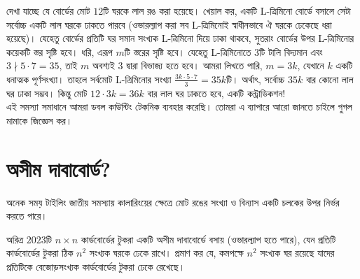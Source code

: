 \documentclass[11pt]{report}
\begin{document}
\begin{center}
\end{center}

দেখা যাচ্ছে যে বোর্ডের মোট $12$টি ঘরকে লাল রঙ করা হয়েছে। খেয়াল কর, একটি L-ত্রিমিনো বোর্ডে বসালে সেটা সর্বোচ্চ একটি লাল ঘরকে ঢাকতে পারবে (ওভারল্যাপ করা সব L-ত্রিমিনোই স্বাধীনভাবে ঐ ঘরকে ঢেকেছে ধরা হয়েছে)। যেহেতু বোর্ডের প্রতিটি ঘর সমান সংখ্যক L-ত্রিমিনো দিয়ে ঢাকা থাকবে, সুতরাং বোর্ডের উপর L-ত্রিমিনোর কয়েকটি স্তর সৃষ্টি হবে। ধরি, এরূপ $m$টি স্তরের সৃষ্টি হবে। যেহেতু L-ত্রিমিনোতে $3$টি টালি বিদ্যমান এবং $3 \nmid 5 \cdot 7 = 35$, তাই $m$ অবশ্যই $3$ দ্বারা বিভাজ্য হতে হবে। আমরা লিখতে পারি, $m = 3k$, যেখানে $k$ একটি ধনাত্মক পূর্ণসংখ্যা। তাহলে সর্বমোট L-ত্রিমিনোর সংখ্যা $\frac{3k \cdot 5 \cdot 7}{3} = 35k$টি। অর্থাৎ, সর্বোচ্চ $35k$ বার কোনো লাল ঘর ঢাকা সম্ভব। কিন্তু মোট $12 \cdot 3k = 36k$ বার লাল ঘর ঢাকতে হবে, একটি কন্ট্রাডিকশন!\\

এই সমস্যা সমাধানে আমরা ডবল কাউন্টিং টেকনিক ব্যবহার করেছি। তোমরা এ ব্যাপারে আরো জানতে চাইলে গুগল মামাকে জিজ্ঞেস কর।\\

\section{অসীম দাবাবোর্ড?}

অনেক সময় টাইলিং জাতীয় সমস্যায় কালারিংয়ের ক্ষেত্রে মোট রঙের সংখ্যা ও বিন্যাস একটি চলকের উপর নির্ভর করতে পারে।\\

\begin{tcolorbox}[colframe=black!80!green,title=Tournament of Towns 2009]
অরিত্র $2023$টি $n \times n$ কার্ডবোর্ডের টুকরা একটি অসীম দাবাবোর্ডে বসায় (ওভারল্যাপ হতে পারে), যেন প্রতিটি কার্ডবোর্ডের টুকরা ঠিক $n^2$ সংখ্যক ঘরকে ঢেকে রাখে। প্রমাণ কর যে, কমপক্ষে $n^2$ সংখ্যক ঘর রয়েছে যাদের প্রতিটিকে বেজোড়সংখ্যক কার্ডবোর্ডের টুকরা ঢেকে রেখেছে।
\end{tcolorbox}
\end{document}
